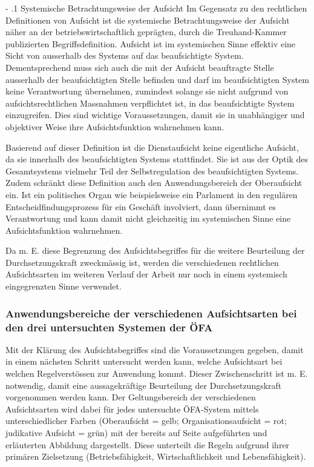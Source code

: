 \documentclass[10pt]{article}
\makeatletter
\renewcommand\paragraph{\@startsection{paragraph}{3}{0mm}{-\baselineskip}{.1\baselineskip}{\normalfont\normalsize\bfseries}}
\renewcommand\paragraph{%
\@startsection{paragraph}{3}{0mm}%
{-\baselineskip}%
{.1\baselineskip}%
{\normalfont\normalsize\bfseries}}
\makeatother
\begin{document}
\paragraph{Systemische Betrachtungsweise der Aufsicht}\label{para:systemische_betrachtungsweise_der_aufsicht}
Im Gegensatz zu den rechtlichen Definitionen von Aufsicht ist die systemische Betrachtungsweise der Aufsicht näher an der betriebswirtschaftlich geprägten, durch die Treuhand-Kammer publizierten Begriffsdefinition. Aufsicht ist im systemischen Sinne effektiv eine Sicht von ausserhalb des Systems auf das beaufsichtigte System. Dementsprechend muss sich auch die mit der Aufsicht beauftragte Stelle ausserhalb der beaufsichtigten Stelle befinden und darf im beaufsichtigten System keine Verantwortung übernehmen, zumindest solange sie nicht aufgrund von aufsichts­rechtlichen Massnahmen verpflichtet ist, in das beaufsichtigte System einzugreifen. Dies sind wichtige Voraussetzungen, damit sie in unabhängiger und objektiver Weise ihre Aufsichts­funktion wahrnehmen kann.

Basierend auf dieser Definition ist die Dienstaufsicht keine eigentliche Aufsicht, da sie innerhalb des beaufsichtigten Systems stattfindet. Sie ist aus der Optik des Gesamt­systems vielmehr Teil der Selbstregulation des beaufsichtigten Systems. Zudem schränkt diese Definition auch den Anwendungsbereich der Oberaufsicht ein. Ist ein politisches Organ wie beispielsweise ein Parlament in den regulären Entscheidfindungsprozess für ein Geschäft involviert, dann übernimmt es Verantwortung und kann damit nicht gleichzeitig im systemischen Sinne eine Aufsichts­funktion wahrnehmen.

Da m. E. diese Begrenzung des Aufsichtsbegriffes für die weitere Beurteilung der Durch­setzungskraft zweckmässig ist, werden die verschiedenen rechtlichen Aufsichts­arten im weiteren Verlauf der Arbeit nur noch in einem systemisch eingegrenzten Sinne verwendet.

\subsubsection{Anwendungsbereiche der verschiedenen Aufsichtsarten bei den drei untersuchten Systemen der ÖFA}\label{subsubsec:anwendungsbereiche_der_verschiedenen_aufsichtsarten_bei_den_drei_untersuchten_systemen_der_ofa}
Mit der Klärung des Aufsichtsbegriffes sind die Voraussetzungen gegeben, damit in einem nächsten Schritt untersucht werden kann, welche Aufsichtsart bei welchen Regelver­stössen zur Anwendung kommt. Dieser Zwischenschritt ist m. E. notwendig, damit eine aussage­kräftige Beurteilung der Durchsetzungskraft vorgenommen werden kann. Der Geltungs­bereich der verschiedenen Aufsichtsarten wird dabei für jedes unter­suchte ÖFA-System mittels unterschiedlicher Farben (Oberaufsicht = gelb; Organisations­aufsicht = rot; judikative Aufsicht = grün) mit der bereits auf Seite \pageref{fig:pyramide_der_zweckmaessigen_ausrichtung_der_finanzregularien} aufgeführten und erläuterten Abbildung dargestellt. Diese unterteilt die Regeln aufgrund ihrer primären Zielsetzung (Betriebs­fähigkeit, Wirtschaft­lichkeit und Lebensfähigkeit).
\end{document}
